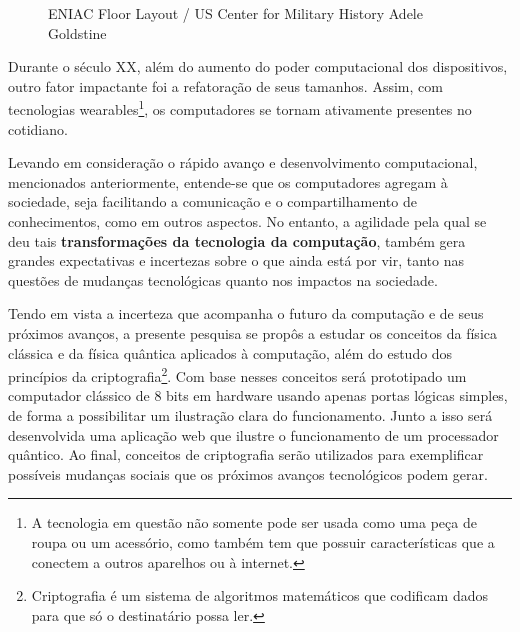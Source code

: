 \vspace{1cm}
\begin{figure}[H] \centering 
  \caption{\label{fig:1} ENIAC Floor Layout / US Center for Military History
  Adele Goldstine} 
\end{figure}


Durante o século XX, além do aumento do poder computacional dos dispositivos, outro fator impactante foi a refatoração de seus tamanhos. Assim, com tecnologias wearables\footnote{A tecnologia em questão não somente pode ser usada como uma peça de roupa ou um acessório, como também tem que possuir características que a conectem a outros aparelhos ou à internet.}, os computadores se tornam ativamente presentes no cotidiano.

Levando em consideração o rápido avanço e desenvolvimento computacional, mencionados anteriormente, entende-se que os computadores agregam à sociedade, seja facilitando a comunicação e o compartilhamento de conhecimentos, como em outros aspectos. No entanto, a agilidade pela qual se deu tais \textbf{transformações da tecnologia da computação}, também gera grandes expectativas e incertezas sobre o que ainda está por vir, tanto nas questões de mudanças tecnológicas quanto nos impactos na sociedade.

Tendo em vista a incerteza que acompanha o futuro da computação e de seus próximos avanços, a presente pesquisa se propôs a estudar os conceitos da física clássica e da física quântica aplicados à computação, além do estudo dos princípios da criptografia\footnote{Criptografia é um sistema de algoritmos matemáticos que codificam dados para que só o destinatário possa ler.}. Com base nesses conceitos será prototipado um computador clássico de 8 bits em hardware usando apenas portas lógicas simples, de forma a possibilitar um ilustração clara do funcionamento. Junto a isso será desenvolvida uma aplicação web que ilustre o funcionamento de um processador quântico. Ao final, conceitos de criptografia serão utilizados para exemplificar possíveis mudanças sociais que os próximos avanços tecnológicos podem gerar.


